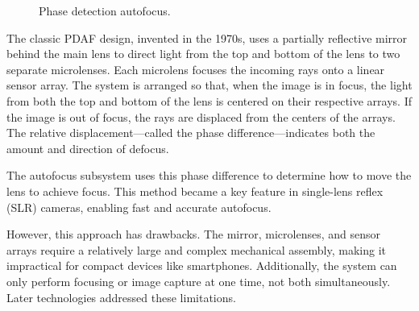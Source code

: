 \documentclass[
  letterpaper,
]{book}
\begin{document}
\begin{figure}


\caption{\label{fig-focusprinciples-classic}Phase detection autofocus.}

\end{figure}%

The classic PDAF design, invented in the 1970s, uses a partially
reflective mirror behind the main lens to direct light from the top and
bottom of the lens to two separate microlenses. Each microlens focuses
the incoming rays onto a linear sensor array. The system is arranged so
that, when the image is in focus, the light from both the top and bottom
of the lens is centered on their respective arrays. If the image is out
of focus, the rays are displaced from the centers of the arrays. The
relative displacement---called the phase difference---indicates both the
amount and direction of defocus.

The autofocus subsystem uses this phase difference to determine how to
move the lens to achieve focus. This method became a key feature in
single-lens reflex (SLR) cameras, enabling fast and accurate autofocus.

However, this approach has drawbacks. The mirror, microlenses, and
sensor arrays require a relatively large and complex mechanical
assembly, making it impractical for compact devices like smartphones.
Additionally, the system can only perform focusing or image capture at
one time, not both simultaneously. Later technologies addressed these
limitations.
\end{document}
